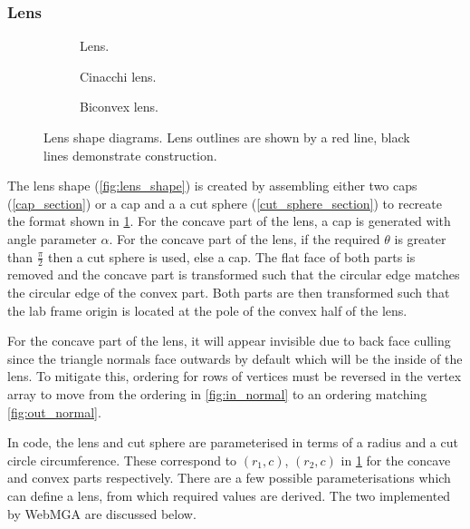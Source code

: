 \subsubsection{Lens}
\begin{figure}
  \begin{center}
    \begin{subfigure}{0.3\textwidth}
      
      \caption{Lens.}
      \label{fig:lens_diagram}
    \end{subfigure}
    \begin{subfigure}{0.3\textwidth}
      
      \caption{Cinacchi lens.}
      \label{fig:cinacchi_lens_diagram}
    \end{subfigure}
    \begin{subfigure}{0.3\textwidth}
      
      \caption{Biconvex lens.}
      \label{fig:biconvex_lens_diagram}
    \end{subfigure}
  \end{center}
  \caption{Lens shape diagrams. Lens outlines are shown by a red line, black lines demonstrate construction.}
  \label{fig:lens_descriptions}
\end{figure}

The lens shape (\cref{fig:lens_shape}) is created by assembling either two caps (\cref{cap_section}) or a cap and a a cut sphere (\cref{cut_sphere_section}) to recreate the format shown in \cref{fig:lens_diagram}. For the concave part of the lens, a cap is generated with angle parameter $\alpha$. For the concave part of the lens, if the required $\theta$ is greater than $\frac{\pi}{2}$ then a cut sphere is used, else a cap. The flat face of both parts is removed and the concave part is transformed such that the circular edge matches the circular edge of the convex part. Both parts are then transformed such that the lab frame origin is located at the pole of the convex half of the lens.

For the concave part of the lens, it will appear invisible due to back face culling since the triangle normals face outwards by default which will be the inside of the lens. To mitigate this, ordering for rows of vertices must be reversed in the vertex array to move from the ordering in \cref{fig:in_normal} to an ordering matching \cref{fig:out_normal}.

In code, the lens and cut sphere are parameterised in terms of a radius and a cut circle circumference. These correspond to $(r_1,c)$, $(r_2,c)$ in \cref{fig:lens_diagram} for the concave and convex parts respectively. There are a few possible parameterisations which can define a lens, from which required values are derived. The two implemented by WebMGA are discussed below.
